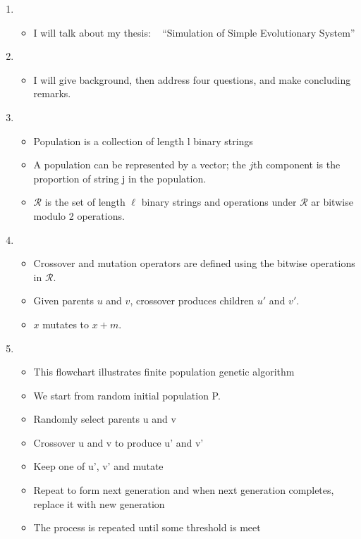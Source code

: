 \documentclass{article}
\begin{document}
\setcounter{page}{1}    
\newlength{\mywidth}
\setlength{\mywidth}{0.9\linewidth}
\newlength{\myheight}
\setlength{\myheight}{0.5in}
    
\begin{enumerate}
\item
  \begin{itemize}
  \item I will talk about my thesis: \hfill\mbox{ }\linebreak
      ``Simulation of Simple Evolutionary System'' 
  \end{itemize}
    
\item
  \begin{itemize}
  \item
      I will give background, then address four questions, and make
      concluding remarks.    
  \end{itemize}

\item
  \begin{itemize}
  \item Population is a collection of length l binary strings 
  \item A population can be represented by a vector; the $j$th component
      is the proportion of string j in the population.
    \item $\mathcal{R}$ is the set of length $\ell$ binary strings and operations under $\mathcal{R}$ ar bitwise modulo 2 operations.
  \end{itemize}
    
\item
  \begin{itemize}
  \item Crossover and mutation operators are defined using the
    bitwise operations in $\mathcal{R}$.
  \item Given parents $u$ and $v$, crossover produces children $u'$ and $v'$.
  \item $x$ mutates to $x + m$.
  \end{itemize}
    
\item
  \begin{itemize}
  \item This flowchart illustrates finite population genetic algorithm
  \item  We start from random initial population P.
  \item Randomly select parents u and v 
  \item Crossover u and v to produce u' and v'
  \item Keep one of u', v' and mutate
  \item Repeat to form next generation and when next generation completes, replace it with new generation
  \item The process is repeated until some threshold is meet
  \end{itemize}
    

\end{enumerate}
\end{document}
